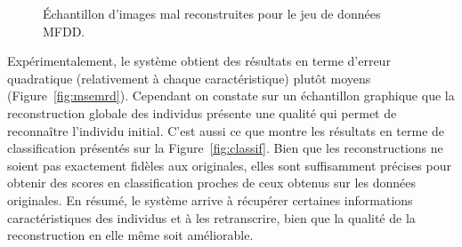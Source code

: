 \documentclass[a4paper]{article}
\begin{document}
\begin{figure}[h]
    \caption{Échantillon d'images mal reconstruites pour le jeu de données MFDD.}
\label{fig:num_reconstructed_bad}
\end{figure}



Expérimentalement, le système obtient des résultats en terme d'erreur quadratique (relativement à chaque caractéristique) plutôt moyens (Figure~\ref{fig:msemrd}). Cependant on constate sur un échantillon graphique que la reconstruction globale des individus présente une qualité qui permet de reconnaître l'individu initial. C'est aussi ce que montre les résultats en terme de classification présentés sur la Figure~\ref{fig:classif}. Bien que les reconstructions ne soient pas exactement fidèles aux originales, elles sont suffisamment précises pour obtenir des scores en classification proches de ceux obtenus sur les données originales. En résumé, le système arrive à récupérer certaines informations caractéristiques des individus et à les retranscrire, bien que la qualité de la reconstruction en elle m\^{e}me soit améliorable.
\end{document}
